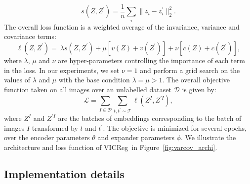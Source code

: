 \documentclass{article}
\newcommand{\algo}{VICReg}
\newcommand{\expander}{expander }
\begin{document}
\begin{equation} \label{eq:invariance}
    s(Z, Z^{\prime}) = \frac{1}{n} \sum_i \|z_i - z^{\prime}_i\|_2^2.
\end{equation}
The overall loss function is a weighted average of the invariance, variance and covariance terms:
\begin{equation} \label{eq:loss}
    \ell(Z, Z^{\prime}) = \ \lambda s(Z, Z^{\prime}) + \mu [ v(Z) + v(Z^{\prime}) ] + \nu [ c(Z) + c(Z^{\prime}) ],
\end{equation}
where $\lambda$, $\mu$ and $\nu$ are hyper-parameters controlling the importance of each term in the loss. In our experiments, we set $\nu = 1$ and perform a grid search on the values of $\lambda$ and $\mu$ with the base condition $\lambda = \mu > 1$. The overall objective function taken on all images over an unlabelled dataset $\mathcal{D}$ is given by:
\begin{equation} \label{eq:final_loss}
    \mathcal{L} = \sum_{I \in \mathcal{D}} \sum_{t, t^{\prime} \sim \mathcal{T}} \ell(Z^{I}, Z^{\prime I}),
\end{equation}
where $Z^{I}$ and $Z^{\prime I}$ are the batches of embeddings corresponding to the batch of images $I$ transformed by $t$ and $t^{\prime}$. The objective is minimized for several epochs, over the encoder parameters $\theta$ and \expander parameters $\phi$. We illustrate the architecture and loss function of \algo \ in Figure~\ref{fig:varcov_archi}.\\
\setlength\intextsep{0pt}
\subsection{Implementation details} \label{sec:impl_details}
\end{document}
